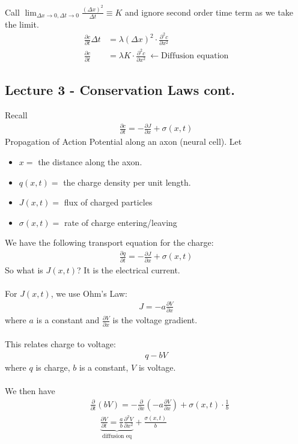 \documentclass[12pt, letterpaper]{article}
\begin{document}
Call $\lim_{\Delta x \rightarrow 0, \Delta t \rightarrow 0} \frac{(\Delta x)^2}{\Delta t} \equiv K$ and ignore second order time term as we take the limit.
\begin{align*}
    \frac{\partial c}{\partial t} \Delta t &= \lambda (\Delta x)^2\cdot \frac{\partial^2 c}{\partial x^2} \\
    \frac{\partial c}{\partial t} &= \lambda K\cdot \frac{\partial^2 c}{\partial x^2}\ \leftarrow \text{Diffusion equation}
\end{align*}
\subsection{Lecture 3 - Conservation Laws cont.}
Recall
\begin{align*}
    \frac{\partial c}{\partial t} = -\frac{\partial J}{\partial x} + \sigma(x,t)
\end{align*}
 Propagation of Action Potential along an axon (neural cell). Let 
\begin{itemize}
    \item $x = $ the distance along the axon. 
    \item $q(x,t) = $ the charge density per unit length.
    \item $J(x,t) = $ flux of charged particles
    \item $\sigma(x,t) = $ rate of charge entering/leaving 
\end{itemize}
We have the following transport equation for the charge:
\begin{align*}
    \frac{\partial q}{\partial t} = - \frac{\partial J}{\partial x} + \sigma(x,t)
\end{align*}
So what is $J(x,t)$? It is the electrical current. \\ \\
For $J(x,t)$, we use Ohm's Law:
\begin{align*}
    J = -a \frac{\partial V}{\partial x}
\end{align*}
where $a$ is a constant and $\frac{\partial V}{\partial x}$ is the voltage gradient. \\ \\
This relates charge to voltage:
\begin{align*}
    q - bV
\end{align*}
where $q$ is charge, $b$ is a constant, $V$ is voltage. \\ \\
We then have
\begin{align*}
    &\frac{\partial}{\partial t}(bV) = -\frac{\partial}{\partial x} (-a \frac{\partial V}{\partial x}) + \sigma (x,t)\cdot \frac 1b \\
    & \quad\ \underbrace{\frac{\partial V}{\partial t} = \frac ab \frac{\partial^2 V}{\partial x^2}}_{\text{diffusion eq}} + \frac{\sigma(x,t)}{b}
\end{align*}
\end{document}
